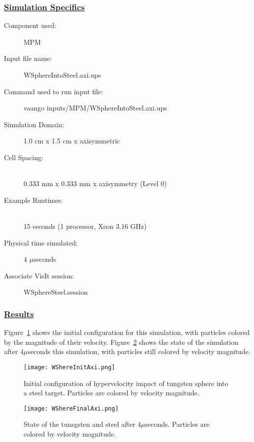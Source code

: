 \subsubsection*{\underline{Simulation Specifics}}
\begin{description}
\item [Component used:] \hfill MPM
\item [Input file name:] \hfill WSphereIntoSteel.axi.ups
\item [Command used to run input file:]\hfill vaango inputs/MPM/WSphereIntoSteel.axi.ups
\item [Simulation Domain:]\hfill 1.0 cm x 1.5 cm x axisymmetric

\item [Cell Spacing:]\hfill \\
  0.333 mm x 0.333 mm x axisymmetry (Level 0)

\item [Example Runtimes:] \hfill \\
 15 seconds  (1 processor, Xeon 3.16 GHz)\\

\item [Physical time simulated:] \hfill 4 $\mu$seconds

\item [Associate VisIt session:] \hfill WSphereSteel.session

\end{description}

\subsubsection*{\underline{Results}}

Figure~\ref{fig:WSphereSteelInit} shows the initial configuration for
this simulation, with particles colored by the magnitude of their velocity.
Figure~\ref{fig:WSphereSteelFinal} shows the state of the simulation after
$4 \mu$seconds this simulation, with particles still colored by velocity
magnitude.

\begin{figure}
  \center
  \texttt{[image: WShereInitAxi.png]}
  \caption{Initial configuration of hypervelocity impact of tungsten sphere
           into a steel target.  Particles are
           colored by velocity magnitude.}
  \label{fig:WSphereSteelInit}
\end{figure}
\begin{figure}
  \center
  \texttt{[image: WShereFinalAxi.png]}
  \caption{State of the tunsgsten and steel after $4 \mu$seconds.
           Particles are colored by velocity magnitude.}
  \label{fig:WSphereSteelFinal}
\end{figure}

